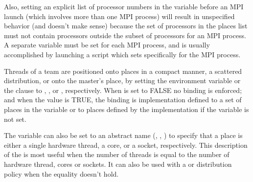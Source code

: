 Also, setting an explicit list of processor numbers in the  
variable before an MPI launch (which involves more than one MPI process) will
result in unspecified behavior (and doesn't make sense) because the set of 
processors in the places list must not contain processors outside the subset 
of processors for an MPI process. A separate  variable must
be set for each MPI process, and is usually accomplished by launching a script 
which sets  specifically for the MPI process. 

Threads of a team are positioned onto places in a compact manner, a 
scattered distribution, or onto the master's place, by setting the 
 environment variable or the  clause  to 
, , or , respectively.  When 
 is set to FALSE no binding is enforced; and 
when the value is TRUE, the binding is implementation defined to 
a set of places in the  variable or to places 
defined by the implementation if the  variable 
is not set.

The  variable can also be set to an abstract name 
(, , ) to specify that a place is
either a single hardware thread, a core, or a socket, respectively. 
This description of the  is most useful when the 
number of threads is equal to the number of hardware thread, cores
or sockets.  It can also be used with a  or  
distribution policy when the equality doesn't hold.




%   
%     

%   
%    
%     

